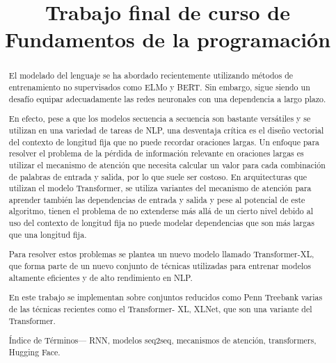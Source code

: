 \documentclass[conference]{IEEEtran}
\begin{document}
\title{\bf{Trabajo final de curso de Fundamentos de la programación}}

\author{
\and
{}
}

\maketitle

\begin{abstract}
El modelado del lenguaje se ha abordado recientemente utilizando m\'etodos de entrenamiento no supervisados como ELMo y BERT. Sin embargo, sigue siendo un desaf\'io equipar adecuadamente las redes neuronales con una dependencia a largo plazo. 

En efecto, pese a que los modelos secuencia a secuencia son bastante vers\'atiles y se utilizan en una variedad de tareas de NLP, una desventaja cr\'itica es el dise\~no vectorial del contexto de longitud fija que no puede recordar oraciones largas. Un enfoque para resolver el problema de la p\'erdida de informaci\'on relevante en oraciones largas es utilizar el mecanismo de atenci\'on que necesita calcular un valor para cada combinaci\'on de palabras de entrada y salida, por lo que suele ser costoso.  En  arquitecturas que utilizan el modelo Transformer, se utiliza variantes del mecanismo de atenci\'on  para aprender tambi\'en las dependencias de entrada y salida y pese al potencial de este algoritmo, tienen el problema de no extenderse m\'as all\'a de un cierto nivel debido al uso del contexto de longitud fija no puede modelar dependencias que son m\'as largas que una longitud fija.

Para resolver estos problemas se plantea un nuevo modelo llamado Transformer-XL, que forma parte  de un nuevo conjunto de t\'ecnicas utilizadas para entrenar modelos altamente eficientes y de alto rendimiento en NLP. 

En este trabajo se implementan sobre conjuntos reducidos como Penn Treebank varias de las t\'ecnicas recientes como el Transformer- XL, XLNet, que son una variante del  Transformer.

\vspace{0.2cm}


\'Indice de T\'erminos— RNN, modelos seq2seq, mecanismos de atenci\'on, transformers,  Hugging Face.
    
\end{abstract}
\end{document}
